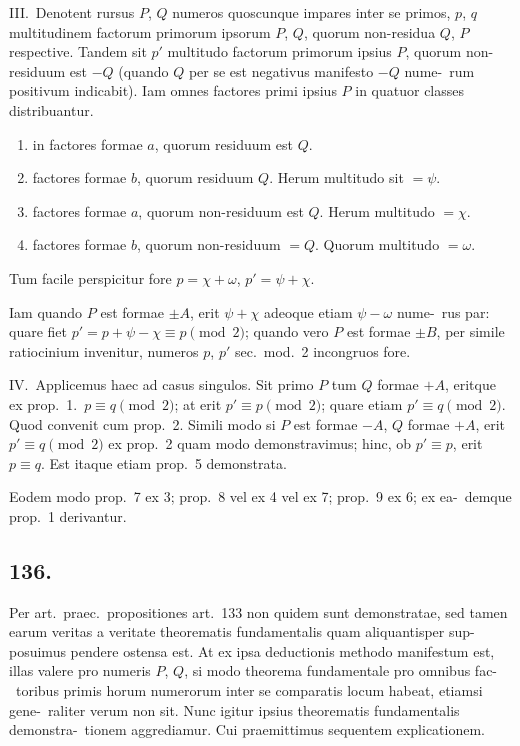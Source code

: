 \documentclass[12pt,a4paper]{article}
\theoremstyle{plain}
\theoremstyle{definition}
\theoremstyle{remark}
\begin{document}
III.\ Denotent rursus $P$, $Q$ numeros quoscunque impares inter se primos,
$p$, $q$ multitudinem factorum primorum ipsorum $P$, $Q$, quorum non-residua $Q$,
$P$ respective. Tandem sit $p'$ multitudo factorum primorum ipsius $P$, quorum
non-residuum est $-Q$ (quando $Q$ per se est negativus manifesto $-Q$ nume-\ rum positivum indicabit). Iam omnes factores primi ipsius $P$ in quatuor classes
distribuantur.
\begin{enumerate}[label=\arabic*)]
\item in factores formae $a$, quorum residuum est $Q$.
\item factores formae $b$, quorum residuum $Q$. Herum multitudo sit $= \psi$.
\item factores formae $a$, quorum non-residuum est $Q$. Herum multitudo $= \chi$.
\item factores formae $b$, quorum non-residuum $= Q$. Quorum multitudo $= \omega$.
\end{enumerate}
Tum facile perspicitur fore $p = \chi + \omega$, $p' = \psi + \chi$.

Iam quando $P$ est formae $\pm A$, erit $\psi + \chi$ adeoque etiam $\psi - \omega$ nume-\ rus par: quare fiet $p' = p + \psi - \chi \equiv p \pmod{2}$; quando vero $P$ est formae $\pm B$,
per simile ratiocinium invenitur, numeros $p$, $p'$ sec.\ mod.\ 2 incongruos fore.

IV.\ Applicemus haec ad casus singulos. Sit primo $P$ tum $Q$ formae
$+A$, eritque ex prop.~1.\ $p \equiv q \pmod{2}$; at erit $p' \equiv p \pmod{2}$; quare etiam
$p' \equiv q \pmod{2}$. Quod convenit cum prop.~2. Simili modo si $P$ est formae $-A$, $Q$
formae $+A$, erit $p' \equiv q \pmod{2}$ ex prop.~2 quam modo demonstravimus; hinc,
ob $p' \equiv p$, erit $p \equiv q$. Est itaque etiam prop.~5 demonstrata.

Eodem modo prop.~7 ex 3; prop.~8 vel ex 4 vel ex 7; prop.~9 ex 6; ex ea-\ demque prop.~1 derivantur.

\subsection*{136.}

Per art.\ praec.\ propositiones art.~133 non quidem sunt demonstratae, sed
tamen earum veritas a veritate theorematis fundamentalis quam aliquantisper sup-
posuimus pendere ostensa est. At ex ipsa deductionis methodo manifestum est,
illas valere pro numeris $P$, $Q$, si modo theorema fundamentale pro omnibus fac-\ toribus primis horum numerorum inter se comparatis locum habeat, etiamsi gene-\ raliter verum non sit. Nunc igitur ipsius theorematis fundamentalis demonstra-\ tionem aggrediamur. Cui praemittimus sequentem explicationem.
\end{document}
